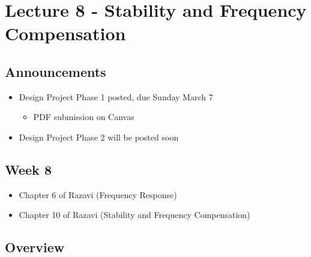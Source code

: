 \documentclass[11pt]{article}
\providecommand{\tightlist}{%
      \setlength{\itemsep}{0pt}\setlength{\parskip}{0pt}}
\begin{document}
    \hypertarget{lecture-8---stability-and-frequency-compensation}{%
\section{Lecture 8 - Stability and Frequency
Compensation}\label{lecture-8---stability-and-frequency-compensation}}

    \hypertarget{announcements}{%
\subsection{Announcements}\label{announcements}}

    \begin{itemize}
\tightlist
\item
  Design Project Phase 1 posted, due Sunday March 7

  \begin{itemize}
  \tightlist
  \item
    PDF submission on Canvas
  \end{itemize}
\item
  Design Project Phase 2 will be posted soon
\end{itemize}

    \hypertarget{week-8}{%
\subsection{Week 8}\label{week-8}}

    \begin{itemize}
\tightlist
\item
  Chapter 6 of Razavi (Frequency Response)
\item
  Chapter 10 of Razavi (Stability and Frequency Compensation)
\end{itemize}

    \hypertarget{overview}{%
\subsection{Overview}\label{overview}}
\end{document}
